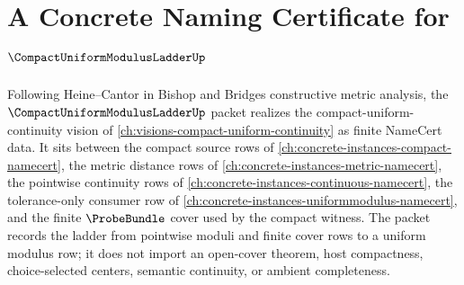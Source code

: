\chapter{A Concrete Naming Certificate for $\CompactUniformModulusLadderUp$}
\label{ch:concrete-instances-compact-uniform-modulus-ladder-namecert}

Following Heine--Cantor in Bishop and Bridges constructive metric analysis, the $\CompactUniformModulusLadderUp$ packet realizes the compact-uniform-continuity vision of \autoref{ch:visions-compact-uniform-continuity} as finite NameCert data. It sits between the compact source rows of \autoref{ch:concrete-instances-compact-namecert}, the metric distance rows of \autoref{ch:concrete-instances-metric-namecert}, the pointwise continuity rows of \autoref{ch:concrete-instances-continuous-namecert}, the tolerance-only consumer row of \autoref{ch:concrete-instances-uniformmodulus-namecert}, and the finite $\ProbeBundle$ cover used by the compact witness. The packet records the ladder from pointwise moduli and finite cover rows to a uniform modulus row; it does not import an open-cover theorem, host compactness, choice-selected centers, semantic continuity, or ambient completeness.

